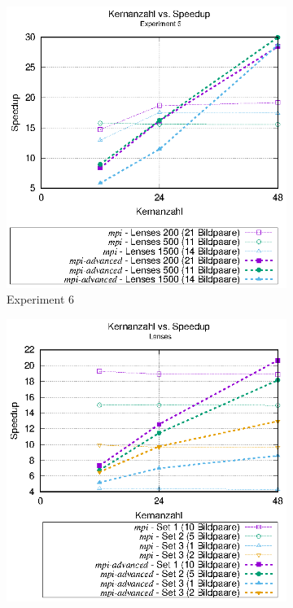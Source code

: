 \begin{center}
	\begin{figure}[htbp]
		\begin{subfigure}[b]{0.45\textwidth}
			\centering
			\includegraphics[width=\textwidth]{pdf/mpi_advanced_speedup_exp6}
			\caption{Experiment 6}
			\label{fig:mpi_advanced_speedup_exp6}
		\end{subfigure}
	\hfill
		\begin{subfigure}[b]{0.45\textwidth}
			\centering
			\includegraphics[width=\textwidth]{pdf/mpi_advanced_speedup_lenses}

\end{subfigure}
\end{figure}
\end{center}
